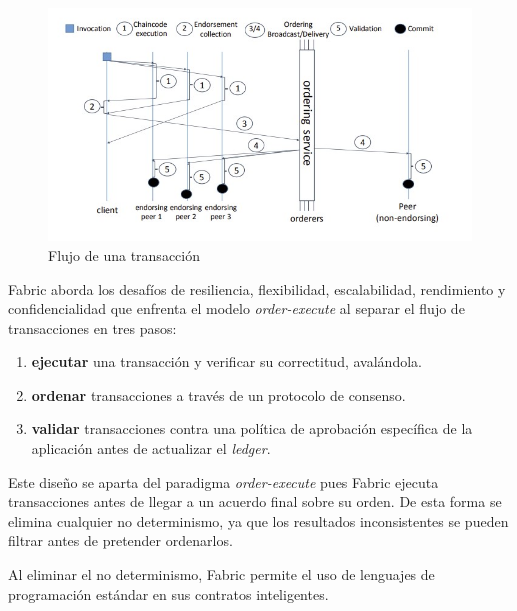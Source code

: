 \begin{figure}[tbph]
\centering
\includegraphics[width=\textwidth]{Images/transaction_flow}
\caption{Flujo de una transacción}
\label{fig:transactionflow}
\end{figure}


Fabric aborda los desafíos de resiliencia, flexibilidad, escalabilidad, rendimiento y confidencialidad que enfrenta el modelo \textit{order-execute} al separar el flujo de transacciones en tres pasos:

\begin{enumerate}
 \item \textbf{ejecutar} una transacción y verificar su correctitud, avalándola.
 \item \textbf{ordenar} transacciones a través de un protocolo de consenso.
   \item \textbf{validar} transacciones contra una política de aprobación específica de la aplicación antes de actualizar el \textit{ledger}.
\end{enumerate}

Este diseño se aparta del paradigma \textit{order-execute} pues Fabric ejecuta transacciones antes de llegar a un acuerdo final sobre su orden. De esta forma se elimina cualquier no determinismo, ya que los resultados inconsistentes se pueden filtrar antes de pretender ordenarlos.

Al eliminar el no determinismo, Fabric permite el uso de lenguajes de programación estándar en sus contratos inteligentes. 


